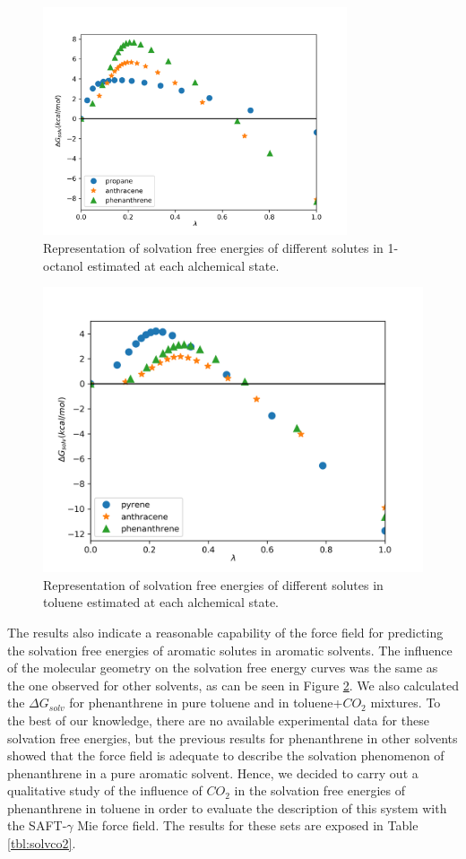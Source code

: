 \begin{figure}[H]
	\centering
	\includegraphics[width=0.8\textwidth]{Figures/oct}
	\caption{Representation of solvation free energies of different solutes in 1-octanol estimated at each alchemical state.}
	\label{fig:oct}
\end{figure}

\begin{figure}[H]
	\centering
	\includegraphics[width=0.8\linewidth]{Figures/tol}
	\caption{Representation of solvation free energies of different solutes in toluene estimated at each alchemical state. }
	\label{fig:tol}
\end{figure}

The results also indicate a reasonable capability of the force field for predicting the solvation free energies of aromatic solutes in aromatic solvents. The influence of the molecular geometry on the solvation free energy curves was the same as the one observed for other solvents, as can be seen in Figure \ref{fig:tol}.  We also calculated the $\Delta G_{solv}$ for phenanthrene in pure toluene and in toluene+$CO_{2}$ mixtures. To the best of our knowledge, there are no available experimental data for these solvation free energies, but the previous results for phenanthrene in other solvents showed that the force field is adequate to describe the solvation phenomenon of phenanthrene in a pure aromatic solvent. Hence, we decided to carry out a qualitative study of the influence of $CO_{2}$ in the solvation free energies of phenanthrene in toluene in order to evaluate the description of this system with the SAFT-$\gamma$ Mie force field. The results for these sets are exposed in Table \ref{tbl:solvco2}.  

